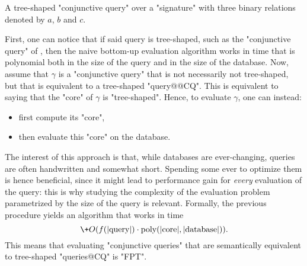 \begin{marginfigure}
	\centering
	\caption{
		\AP\label{fig:intro-tree-shaped-CQ}
		A tree-shaped "conjunctive query" over a "signature"
		with three binary relations denoted by $a$, $b$ and $c$.
	}
\end{marginfigure}
First, one can notice that if said query is tree-shaped,
such as the "conjunctive query" of , then the naive
bottom-up evaluation algorithm works in time that is polynomial both
in the size of the query and in the size of the database.
Now, assume that $\gamma$ is a "conjunctive query" that is not necessarily
not tree-shaped, but that is equivalent to a tree-shaped "query@@CQ".
This is equivalent to saying that the "core" of $\gamma$ is "tree-shaped".
Hence, to evaluate $\gamma$, one can instead:
\begin{itemize}
	\item first compute its "core",
	\item then evaluate this "core" on the database.
\end{itemize}
The interest of this approach is that, while databases are ever-changing,
queries are often handwritten and somewhat short. Spending some ever to optimize
them is hence beneficial, since it might lead to performance gain
for \emph{every} evaluation of the query: this is why studying the
complexity of the evaluation problem parametrized by the size of
the query is relevant.
Formally, the previous procedure yields an algorithm that works in time
\[
	\+O(f(|\text{query}|) \cdot \text{poly}(|\text{core}|, |\text{database}|)).
\]
This means that evaluating "conjunctive queries" that are semantically equivalent to
tree-shaped "queries@CQ" is "FPT".

